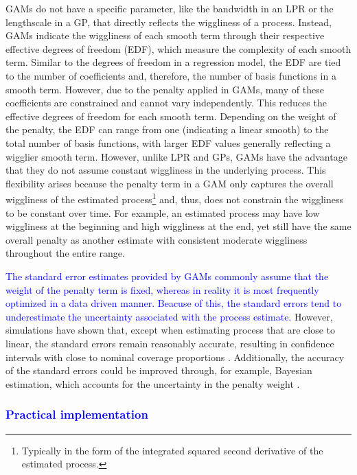 \documentclass[man, floatsintext]{apa7}
\begin{document}
GAMs do not have a specific parameter, like the bandwidth in an LPR or the
lengthscale in a GP, that directly reflects the wiggliness of a process.
Instead, GAMs indicate the wiggliness of each smooth term through their
respective effective degrees of freedom (EDF), which measure the complexity of
each smooth term. Similar to the degrees of freedom in a regression model, the
EDF are tied to the number of coefficients and, therefore, the number of basis
functions in a smooth term. However, due to the penalty applied in GAMs, many
of these coefficients are constrained and cannot vary independently. This
reduces the effective degrees of freedom for each smooth term. Depending on the
weight of the penalty, the EDF can range from one (indicating a linear smooth)
to the total number of basis functions, with larger EDF values generally
reflecting a wigglier smooth term. However, unlike LPR and GPs, GAMs have the
advantage that they do not assume constant wiggliness in the underlying
process. This flexibility arises because the penalty term in a GAM only
captures the overall wiggliness of the estimated process\footnote{Typically in
  the form of the integrated squared second derivative of the estimated
  process.}
and, thus, does not constrain the wiggliness to be constant over time. For
example, an estimated process may have low wiggliness at the beginning and high
wiggliness at the end, yet still have the same overall penalty as another
estimate with consistent moderate wiggliness throughout the entire range.

\textcolor{blue}{
  The standard error estimates provided by GAMs commonly assume that the weight
  of the penalty term is fixed, whereas in reality it is most frequently
  optimized in a data driven manner. Beacuse of this, the standard errors
  tend to underestimate the uncertainty associated with the process estimate.}
However, simulations have shown that,
except when estimating process that are close to linear, the standard errors
remain reasonably accurate, resulting in confidence intervals with close to
nominal coverage proportions \parencite{marra_coverage_2012}. Additionally, the
accuracy of the standard errors could be improved through, for example,
Bayesian estimation, which accounts for the uncertainty in the penalty weight
\parencite{wood_generalized_2006}.

\subsubsection{\textcolor{blue}{Practical implementation}}
\end{document}

